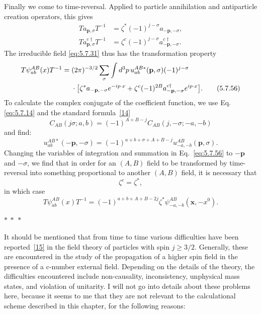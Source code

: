 Finally we come to time-reversal. Applied to particle annihilation and
antiparticle creation operators, this gives
\begin{align}
T a_{\mathbf p,\sigma}T^{-1}&=\zeta^*(-1)^{j-\sigma}
a_{-\mathbf p,-\sigma},
\tag{5.7.54}\label{eq:5.7.54}\\
T a^{c\dagger}_{\mathbf p,\sigma}T^{-1}&=\zeta^c(-1)^{j-\sigma}
a^{c\dagger}_{-\mathbf p,-\sigma}.
\tag{5.7.55}\label{eq:5.7.55}
\end{align}
The irreducible field \eqref{eq:5.7.31} thus has the transformation property
\begin{align}
T\psi^{AB}_{ab}(x)T^{-1}={}&(2\pi)^{-3/2}\sum_\sigma\int d^3p\,
u^{AB*}_{ab}(\mathbf p,\sigma)(-1)^{j-\sigma}
\notag\\
&\cdot\bigl[\zeta^*a_{-\mathbf p,-\sigma}e^{-ip\cdot x}
+\zeta^c(-1)^{2B}a^{c\dagger}_{-\mathbf p,-\sigma}e^{ip\cdot x}\bigr].
\tag{5.7.56}\label{eq:5.7.56}
\end{align}
To calculate the complex conjugate of the coefficient function, we use Eq.
\eqref{eq:5.7.14} and the standard formula~\hyperref[ref:5.14]{[14]}
\begin{equation}
C_{AB}(j\sigma;a,b)=(-1)^{A+B-j}C_{AB}(j,-\sigma;-a,-b)
\tag{5.7.57}\label{eq:5.7.57}
\end{equation}
and find:
\begin{equation}
u^{AB*}_{ab}(-\mathbf p,-\sigma)=
(-1)^{a+b+\sigma+A+B-j}u^{AB}_{-a,-b}(\mathbf p,\sigma).
\tag{5.7.58}\label{eq:5.7.58}
\end{equation}
Changing the variables of integration and summation in Eq.~\eqref{eq:5.7.56} to
$-\mathbf p$ and $-\sigma$, we find that in order for an $(A,B)$ field to be
transformed by time-reversal into something proportional to another $(A,B)$
field, it is necessary that
\begin{equation}
\zeta^c=\zeta^*,
\tag{5.7.59}\label{eq:5.7.59}
\end{equation}
in which case
\begin{equation}
T\psi^{AB}_{ab}(x)T^{-1}=
(-1)^{a+b+A+B-2j}\zeta^*\psi^{AB}_{-a,-b}(\mathbf x,-x^0).
\tag{5.7.60}\label{eq:5.7.60}
\end{equation}

\begin{center}
$*\ *\ *$
\end{center}

It should be mentioned that from time to time various difficulties have been
reported~\hyperref[ref:5.15]{[15]} in the field theory of particles with spin $j\geq 3/2$.
Generally, these are encountered in the study of the propagation of a higher
spin field in the presence of a c-number external field. Depending on the
details of the theory, the difficulties encountered include non-causality,
inconsistency, unphysical mass states, and violation of unitarity. I will not
go into details about these problems here, because it seems to me that they are
not relevant to the calculational scheme described in this chapter, for the
following reasons:

